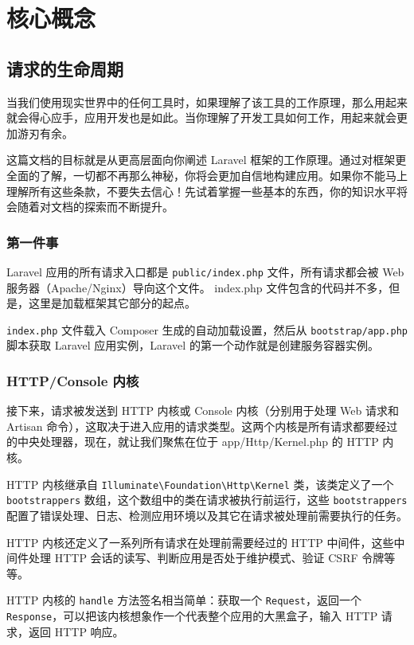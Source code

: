 \documentclass{progartcn}
\begin{document}
\section{核心概念}

\subsection{请求的生命周期}

当我们使用现实世界中的任何工具时，如果理解了该工具的工作原理，那么用起来就会得心应手，应用开发也是如此。当你理解了开发工具如何工作，用起来就会更加游刃有余。

这篇文档的目标就是从更高层面向你阐述 Laravel 框架的工作原理。通过对框架更全面的了解，一切都不再那么神秘，你将会更加自信地构建应用。如果你不能马上理解所有这些条款，不要失去信心！先试着掌握一些基本的东西，你的知识水平将会随着对文档的探索而不断提升。

\subsubsection{第一件事}

Laravel 应用的所有请求入口都是 \verb|public/index.php| 文件，所有请求都会被 Web 服务器（Apache/Nginx）导向这个文件。 index.php 文件包含的代码并不多，但是，这里是加载框架其它部分的起点。

\verb|index.php| 文件载入 Composer 生成的自动加载设置，然后从 \verb|bootstrap/app.php| 脚本获取 Laravel 应用实例，Laravel 的第一个动作就是创建服务容器实例。

\subsubsection{HTTP/Console 内核}

接下来，请求被发送到 HTTP 内核或 Console 内核（分别用于处理 Web 请求和 Artisan 命令），这取决于进入应用的请求类型。这两个内核是所有请求都要经过的中央处理器，现在，就让我们聚焦在位于 app/Http/Kernel.php 的 HTTP 内核。

HTTP 内核继承自 \verb|Illuminate\Foundation\Http\Kernel| 类，该类定义了一个 \verb|bootstrappers| 数组，这个数组中的类在请求被执行前运行，这些 \verb|bootstrappers| 配置了错误处理、日志、检测应用环境以及其它在请求被处理前需要执行的任务。

HTTP 内核还定义了一系列所有请求在处理前需要经过的 HTTP 中间件，这些中间件处理 HTTP 会话的读写、判断应用是否处于维护模式、验证 CSRF 令牌等等。

HTTP 内核的 \verb|handle| 方法签名相当简单：获取一个 \verb|Request|，返回一个 \verb|Response|，可以把该内核想象作一个代表整个应用的大黑盒子，输入 HTTP 请求，返回 HTTP 响应。
\end{document}
